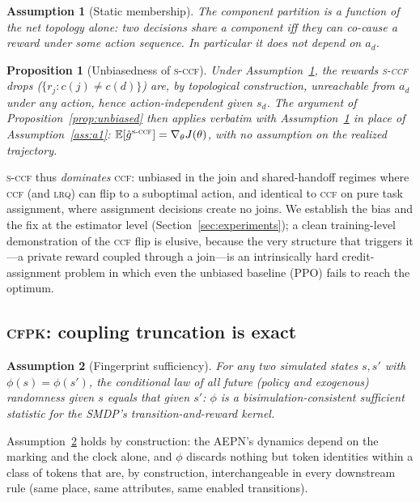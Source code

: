 \documentclass[review,authoryear,3p,times]{elsarticle}
\newtheorem{proposition}{Proposition}
\newtheorem{assumption}{Assumption}
\newcommand{\ccf}{\textsc{ccf}}
\newcommand{\sccf}{\textsc{s-ccf}}
\newcommand{\lrq}{\textsc{lrq}}
\newcommand{\cfpk}{\textsc{cfpk}}
\newcommand{\Ex}{\mathbb{E}}
\begin{document}
\begin{assumption}[Static membership]\label{ass:a1p}
The component partition is a function of the net topology alone: two decisions
share a component iff they can co-cause a reward under \emph{some} action
sequence. In particular it does not depend on $a_d$.
\end{assumption}

\begin{proposition}[Unbiasedness of \sccf]\label{prop:sccf}
Under Assumption~\ref{ass:a1p}, the rewards \sccf{} drops
($\{r_j:c(j)\neq c(d)\}$) are, by topological construction, unreachable from
$a_d$ under any action, hence action-independent given $s_d$. The argument of
Proposition~\ref{prop:unbiased} then applies verbatim with Assumption~\ref{ass:a1p}
in place of Assumption~\ref{ass:a1}: $\Ex[\hat g^{\sccf}]=\nabla_\theta J(\theta)$,
with no assumption on the realized trajectory.
\end{proposition}

\sccf{} thus \emph{dominates} \ccf: unbiased in the join and shared-handoff
regimes where \ccf{} (and \lrq) can flip to a suboptimal action, and identical to
\ccf{} on pure task assignment, where assignment decisions create no joins. We
establish the bias and the fix at the estimator level
(Section~\ref{sec:experiments}); a clean training-level demonstration of the
\ccf{} flip is elusive, because the very structure that triggers it---a private
reward coupled through a join---is an intrinsically hard credit-assignment
problem in which even the unbiased baseline (PPO) fails to reach the optimum.

\subsection{\cfpk: coupling truncation is exact}
\label{sec:theory:cfpk}

\begin{assumption}[Fingerprint sufficiency]\label{ass:a3}
For any two simulated states $s,s'$ with $\phi(s)=\phi(s')$, the conditional
law of all future (policy and exogenous) randomness given $s$ equals that
given $s'$: $\phi$ is a bisimulation-consistent sufficient statistic for the
SMDP's transition-and-reward kernel.
\end{assumption}

Assumption~\ref{ass:a3} holds by construction: the AEPN's dynamics depend on
the marking and the clock alone, and $\phi$ discards nothing but token
identities within a class of tokens that are, by construction, interchangeable
in every downstream rule (same place, same attributes, same enabled
transitions).
\end{document}
